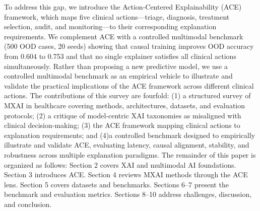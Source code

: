\documentclass[pdflatex,sn-mathphys-num]{sn-jnl}%
\theoremstyle{thmstyleone}%
\theoremstyle{thmstyletwo}%
\theoremstyle{thmstylethree}%
\begin{document}
To address this gap, we introduce the Action-Centered Explainability (ACE) framework, which maps five clinical actions—triage, diagnosis, treatment selection, audit, and monitoring—to their corresponding explanation requirements. We complement ACE with a controlled multimodal benchmark (500 OOD cases, 20 seeds) showing that causal training improves OOD accuracy from 0.604 to 0.753 and that no single explainer satisfies all clinical actions simultaneously.
Rather than proposing a new predictive model, we use a controlled multimodal benchmark as an empirical vehicle to illustrate and validate the practical implications of the ACE framework across different clinical actions.
The contributions of this survey are fourfold: (1) a structured survey of MXAI in healthcare covering methods, architectures, datasets, and evaluation protocols; (2) a critique of model-centric XAI taxonomies as misaligned with clinical decision-making; (3) the ACE framework mapping clinical actions to explanation requirements; and (4)a controlled benchmark designed to empirically illustrate and validate ACE, evaluating latency, causal alignment, stability, and robustness across multiple explanation paradigms. 
The remainder of this paper is organized as follows: Section 2 covers XAI and multimodal AI foundations. Section 3 introduces ACE. Section 4 reviews MXAI methods through the ACE lens. Section 5 covers datasets and benchmarks. Sections 6–7 present the benchmark and evaluation metrics. Sections 8–10 address challenges, discussion, and conclusion.
\end{document}
